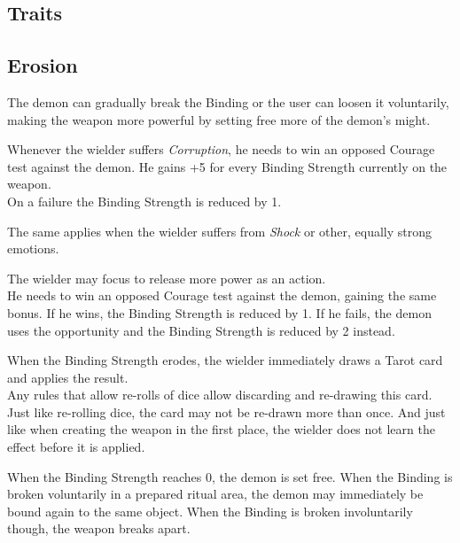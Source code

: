 \subsection{Traits}
\label{sec:traits}

\subsection{Erosion}
The demon can gradually break the Binding
	or the user can loosen it voluntarily,
	making the weapon more powerful by setting free more of the demon's might.
\\%
\begin{sitemize}
	\item Whenever the wielder suffers \emph{Corruption},
		he needs to win an opposed Courage test against the demon.
		He gains +5 for every Binding Strength currently on the weapon.
		\\%
		On a failure the Binding Strength is reduced by 1.
	\item The same applies when the wielder suffers from \emph{Shock}
		or other, equally strong emotions.
	\item The wielder may focus to release more power as an action.
		\\%
		He needs to win an opposed Courage test against the demon,
		gaining the same bonus.
		If he wins, the Binding Strength is reduced by 1.
		If he fails, the demon uses the opportunity
		and the Binding Strength is reduced by 2 instead.
\end{sitemize}
\par%
\needspace{20mm}
When the Binding Strength erodes,
	the wielder immediately draws a Tarot card
	and applies the result.
\\%
Any rules that allow re-rolls of dice
	allow discarding and re-drawing this card.
Just like re-rolling dice, the card may not be re-drawn more than once.
And just like when creating the weapon in the first place,
	the wielder does not learn the effect before it is applied.
\par%
When the Binding Strength reaches 0, the demon is set free.
When the Binding is broken voluntarily in a prepared ritual area,
	the demon may immediately be bound again to the same object.
When the Binding is broken involuntarily though,
	the weapon breaks apart.

\begin{center}
\end{center}
